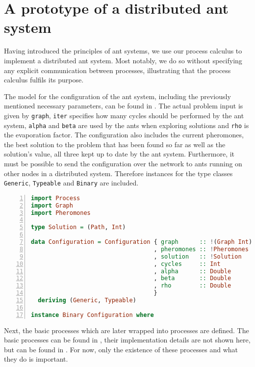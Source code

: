\section{A prototype of a distributed ant system}
\label{chp:ant_system_implementation}
Having introduced the principles of ant systems, we use our process calculus to implement a distributed ant system. Most notably, we do so without specifying any explicit communication between processes, illustrating that the process calculus fulfils its purpose.

The model for the configuration of the ant system, including the previously mentioned necessary parameters, can be found in . The actual problem input is given by \texttt{graph}, \texttt{iter} specifies how many cycles should be performed by the ant system, \texttt{alpha} and \texttt{beta} are used by the ants when exploring solutions and \texttt{rho} is the evaporation factor. The configuration also includes the current pheromones, the best solution to the problem that has been found so far as well as the solution's value, all three kept up to date by the ant system. Furthermore, it must be possible to send the configuration over the network to ants running on other nodes in a distributed system. Therefore instances for the type classes \texttt{Generic}, \texttt{Typeable} and \texttt{Binary} are included.

\begin{lstlisting}[language=Haskell,frame=tb,numbers=left,label=lst:ant_conf,caption=Imports and configuration for the ant system., basicstyle=\footnotesize\ttfamily]
import Process
import Graph
import Pheromones

type Solution = (Path, Int)

data Configuration = Configuration { graph      :: !(Graph Int)
                                   , pheromones :: !Pheromones
                                   , solution   :: !Solution
                                   , cycles     :: Int
                                   , alpha      :: Double
                                   , beta       :: Double
                                   , rho        :: Double
                                   }
  deriving (Generic, Typeable)

instance Binary Configuration where
\end{lstlisting}

Next, the basic processes which are later wrapped into processes are defined. The basic processes can be found in , their implementation details are not shown here, but can be found in . For now, only the existence of these processes and what they do is important.

